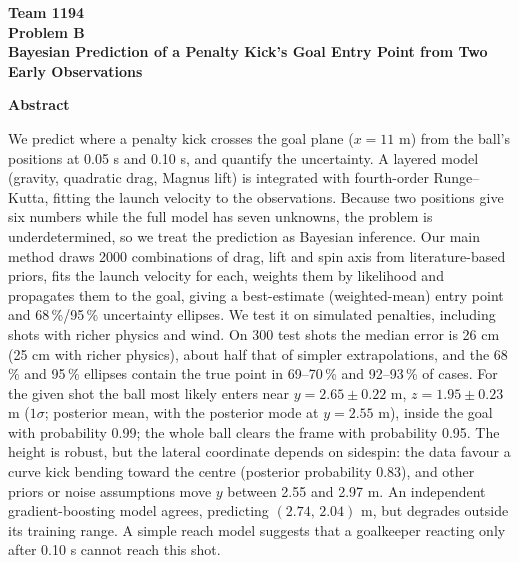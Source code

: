\documentclass[11pt,a4paper]{article}
\newcommand{\teamnum}{1194}   %
\begin{document}
\thispagestyle{plain}
\vspace*{0.3cm}
\begin{center}
  {\Large\bfseries Team \teamnum}\\[4pt]
  {\Large\bfseries Problem B}\\[16pt]
  {\LARGE\bfseries Bayesian Prediction of a Penalty Kick's Goal Entry Point from Two Early Observations}\\[18pt]
\end{center}

\begin{center}
  {\large\bfseries Abstract}
\end{center}
\vspace{2pt}
We predict where a penalty kick crosses the goal plane ($x=11$ m) from the ball's positions at 0.05 s and 0.10 s, and quantify the uncertainty. A layered model (gravity, quadratic drag, Magnus lift) is integrated with fourth-order Runge--Kutta, fitting the launch velocity to the observations. Because two positions give six numbers while the full model has seven unknowns, the problem is underdetermined, so we treat the prediction as Bayesian inference. Our main method draws 2000 combinations of drag, lift and spin axis from literature-based priors, fits the launch velocity for each, weights them by likelihood and propagates them to the goal, giving a best-estimate (weighted-mean) entry point and 68\,\%/95\,\% uncertainty ellipses. We test it on simulated penalties, including shots with richer physics and wind. On 300 test shots the median error is 26 cm (25 cm with richer physics), about half that of simpler extrapolations, and the 68\,\% and 95\,\% ellipses contain the true point in 69--70\,\% and 92--93\,\% of cases. For the given shot the ball most likely enters near $y=2.65\pm0.22$ m, $z=1.95\pm0.23$ m ($1\sigma$; posterior mean, with the posterior mode at $y=2.55$ m), inside the goal with probability 0.99; the whole ball clears the frame with probability 0.95. The height is robust, but the lateral coordinate depends on sidespin: the data favour a curve kick bending toward the centre (posterior probability 0.83), and other priors or noise assumptions move $y$ between 2.55 and 2.97 m. An independent gradient-boosting model agrees, predicting $(2.74,\,2.04)$ m, but degrades outside its training range. A simple reach model suggests that a goalkeeper reacting only after 0.10 s cannot reach this shot.

\newpage
\tableofcontents
\newpage
\end{document}
